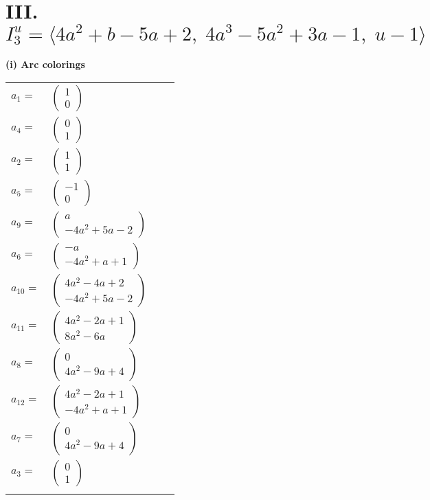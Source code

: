 \documentclass[1p]{elsarticle_modified}
\theoremstyle{definition}
\begin{document}
\centering \section*{III. $I^u_{3}= \langle 4 a^2+b-5 a+2,\;4 a^3-5 a^2+3 a-1,\;u-1 \rangle$}
\flushleft \textbf{(i) Arc colorings}\\
\begin{tabular}{m{7pt} m{180pt} m{7pt} m{180pt} }
\flushright $a_{1}=$&$\begin{pmatrix}1\\0\end{pmatrix}$ \\
\flushright $a_{4}=$&$\begin{pmatrix}0\\1\end{pmatrix}$ \\
\flushright $a_{2}=$&$\begin{pmatrix}1\\1\end{pmatrix}$ \\
\flushright $a_{5}=$&$\begin{pmatrix}-1\\0\end{pmatrix}$ \\
\flushright $a_{9}=$&$\begin{pmatrix}a\\-4 a^2+5 a-2\end{pmatrix}$ \\
\flushright $a_{6}=$&$\begin{pmatrix}- a\\-4 a^2+a+1\end{pmatrix}$ \\
\flushright $a_{10}=$&$\begin{pmatrix}4 a^2-4 a+2\\-4 a^2+5 a-2\end{pmatrix}$ \\
\flushright $a_{11}=$&$\begin{pmatrix}4 a^2-2 a+1\\8 a^2-6 a\end{pmatrix}$ \\
\flushright $a_{8}=$&$\begin{pmatrix}0\\4 a^2-9 a+4\end{pmatrix}$ \\
\flushright $a_{12}=$&$\begin{pmatrix}4 a^2-2 a+1\\-4 a^2+a+1\end{pmatrix}$ \\
\flushright $a_{7}=$&$\begin{pmatrix}0\\4 a^2-9 a+4\end{pmatrix}$ \\
\flushright $a_{3}=$&$\begin{pmatrix}0\\1\end{pmatrix}$\\&\end{tabular}
\end{document}
